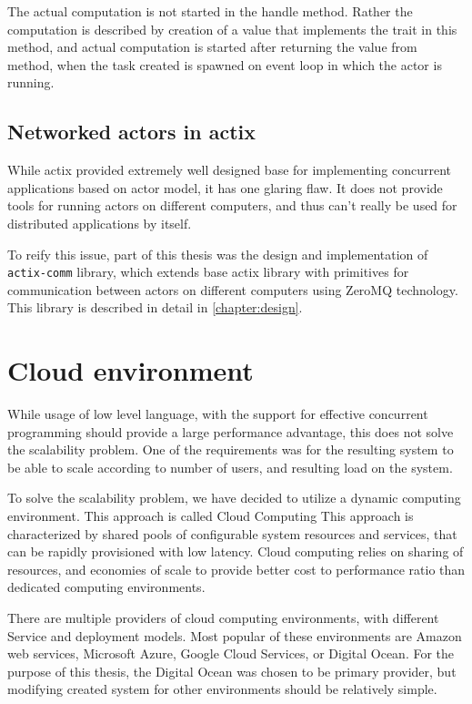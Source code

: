 The actual computation is not started in the handle method. Rather the computation is described by creation
of a value that implements the  trait in this method, and actual computation is started after returning
the value from  method, when the task created is spawned on event loop in which the actor is running.


\subsection{Networked actors in actix}
While actix provided extremely well designed base for implementing concurrent applications based on actor model, it has
one glaring flaw. It does not provide tools for running actors on different computers, and thus can't really be used for
distributed applications by itself.

To reify this issue, part of this thesis was the design and implementation of \verb|actix-comm| library, which extends
base actix library with primitives for communication between actors on different computers using ZeroMQ technology.
This library is described in detail in \autoref{chapter:design}.

\section{Cloud environment}
While usage of low level language, with the support for effective concurrent programming should provide a large performance
advantage, this does not solve the scalability problem. One of the requirements was for the resulting system to
be able to scale according to number of users, and resulting load on the system.

To solve the scalability problem, we have decided to utilize a dynamic computing environment. This approach is called Cloud Computing\cite{wiki:cloud}
This approach is characterized by shared pools of configurable system resources and services, that can be rapidly provisioned
with low latency. Cloud computing relies on sharing of resources, and economies of scale to provide better
cost to performance ratio than dedicated computing environments.

There are multiple providers of cloud computing environments, with different Service and deployment models.
Most popular of these environments are Amazon web services, Microsoft Azure, Google Cloud Services, or Digital Ocean. For the purpose of
this thesis, the Digital Ocean was chosen to be primary provider, but modifying created system for other
environments should be relatively simple.

